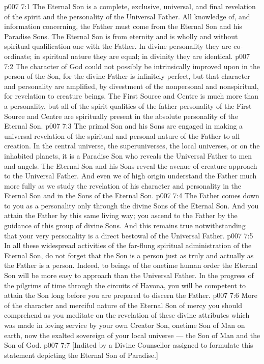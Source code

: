 \vs p007 7:1 The Eternal Son is a complete, exclusive, universal, and final revelation of the spirit and the personality of the Universal Father. All knowledge of, and information concerning, the Father must come from the Eternal Son and his Paradise Sons. The Eternal Son is from eternity and is wholly and without spiritual qualification one with the Father. In divine personality they are co\hyp{}ordinate; in spiritual nature they are equal; in divinity they are identical.
\vs p007 7:2 The character of God could not possibly be intrinsically improved upon in the person of the Son, for the divine Father is infinitely perfect, but that character and personality are amplified, by divestment of the nonpersonal and nonspiritual, for revelation to creature beings. The First Source and Centre is much more than a personality, but all of the spirit qualities of the father personality of the First Source and Centre are spiritually present in the absolute personality of the Eternal Son.
\vs p007 7:3 The primal Son and his Sons are engaged in making a universal revelation of the spiritual and personal nature of the Father to all creation. In the central universe, the superuniverses, the local universes, or on the inhabited planets, it is a Paradise Son who reveals the Universal Father to men and angels. The Eternal Son and his Sons reveal the avenue of creature approach to the Universal Father. And even we of high origin understand the Father much more fully as we study the revelation of his character and personality in the Eternal Son and in the Sons of the Eternal Son.
\vs p007 7:4 The Father comes down to you as a personality only through the divine Sons of the Eternal Son. And you attain the Father by this same living way; you ascend to the Father by the guidance of this group of divine Sons. And this remains true notwithstanding that your very personality is a direct bestowal of the Universal Father.
\vs p007 7:5 \pc In all these widespread activities of the far\hyp{}flung spiritual administration of the Eternal Son, do not forget that the Son is a person just as truly and actually as the Father is a person. Indeed, to beings of the onetime human order the Eternal Son will be more easy to approach than the Universal Father. In the progress of the pilgrims of time through the circuits of Havona, you will be competent to attain the Son long before you are prepared to discern the Father.
\vs p007 7:6 More of the character and merciful nature of the Eternal Son of mercy you should comprehend as you meditate on the revelation of these divine attributes which was made in loving service by your own Creator Son, onetime Son of Man on earth, now the exalted sovereign of your local universe --- the Son of Man and the Son of God.
\vsetoff
\vs p007 7:7 [Indited by a Divine Counsellor assigned to formulate this statement depicting the Eternal Son of Paradise.]
\quizlink
